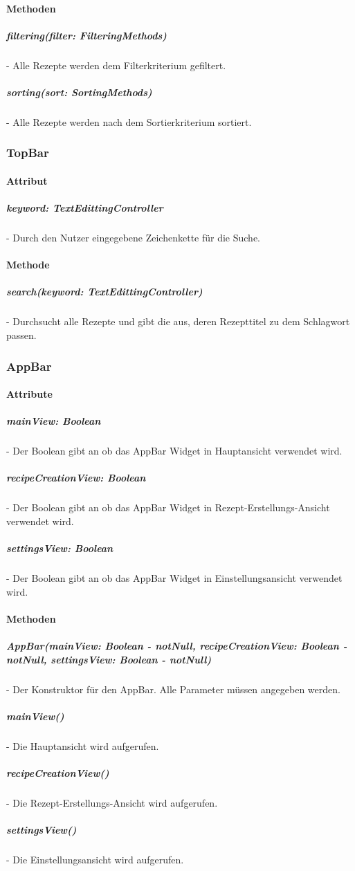 \documentclass[parskip=full]{scrartcl}
\begin{document}
        \paragraph*{Methoden}

            \subparagraph*{filtering(filter: FilteringMethods)} - Alle Rezepte werden dem Filterkriterium gefiltert.
            \subparagraph*{sorting(sort: SortingMethods)} - Alle Rezepte werden nach dem Sortierkriterium sortiert.

    \subsubsection{TopBar}
        \paragraph*{Attribut}

            \subparagraph*{keyword: TextEdittingController} - Durch den Nutzer eingegebene Zeichenkette für die Suche.

        \paragraph*{Methode}
            \subparagraph*{ search(keyword: TextEdittingController)} - Durchsucht alle Rezepte und gibt die aus, deren Rezepttitel zu dem Schlagwort passen.


    \subsubsection{AppBar} \label{sec:AppBar}
        \paragraph*{Attribute}
            \subparagraph*{mainView: Boolean} - Der Boolean gibt an ob das AppBar Widget in Hauptansicht verwendet wird.
            \subparagraph*{recipeCreationView: Boolean} - Der Boolean gibt an ob das AppBar Widget in Rezept-Erstellungs-Ansicht verwendet wird.
            \subparagraph*{settingsView: Boolean} - Der Boolean gibt an ob das AppBar Widget in Einstellungsansicht verwendet wird.

        \paragraph*{Methoden}
            \subparagraph*{AppBar(mainView: Boolean - notNull, recipeCreationView: Boolean - notNull, settingsView: Boolean - notNull)} - Der Konstruktor für den AppBar. Alle Parameter müssen angegeben werden. 
            \subparagraph*{mainView()} - Die Hauptansicht wird aufgerufen.
            \subparagraph*{recipeCreationView()} - Die Rezept-Erstellungs-Ansicht wird aufgerufen.
            \subparagraph*{settingsView()} - Die Einstellungsansicht wird aufgerufen.
\end{document}
